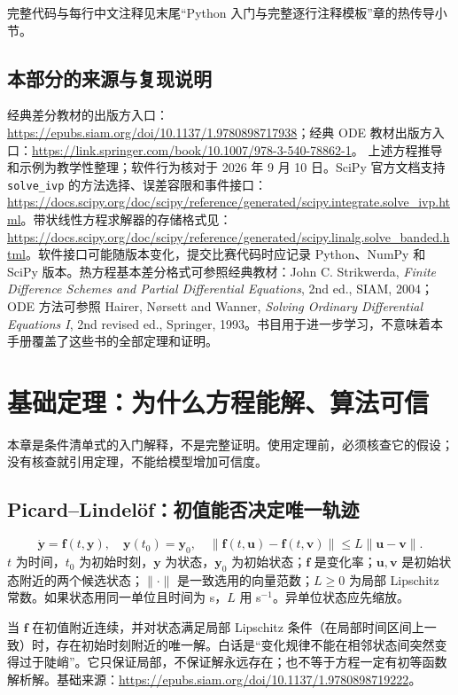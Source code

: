 \documentclass[UTF8,zihao=-4,openany,oneside,fontset=windows]{ctexbook}
\begin{document}
完整代码与每行中文注释见末尾“Python 入门与完整逐行注释模板”章的热传导小节。

\section{本部分的来源与复现说明}
经典差分教材的出版方入口：\url{https://epubs.siam.org/doi/10.1137/1.9780898717938}；经典 ODE 教材出版方入口：\url{https://link.springer.com/book/10.1007/978-3-540-78862-1}。
上述方程推导和示例为教学性整理；软件行为核对于 2026 年 9 月 10 日。SciPy 官方文档支持 \texttt{solve\_ivp} 的方法选择、误差容限和事件接口：\url{https://docs.scipy.org/doc/scipy/reference/generated/scipy.integrate.solve_ivp.html}。带状线性方程求解器的存储格式见：\url{https://docs.scipy.org/doc/scipy/reference/generated/scipy.linalg.solve_banded.html}。软件接口可能随版本变化，提交比赛代码时应记录 Python、NumPy 和 SciPy 版本。热方程基本差分格式可参照经典教材：John C. Strikwerda, \textit{Finite Difference Schemes and Partial Differential Equations}, 2nd ed., SIAM, 2004；ODE 方法可参照 Hairer, N\o rsett and Wanner, \textit{Solving Ordinary Differential Equations I}, 2nd revised ed., Springer, 1993。书目用于进一步学习，不意味着本手册覆盖了这些书的全部定理和证明。

\chapter{基础定理：为什么方程能解、算法可信}
本章是条件清单式的入门解释，不是完整证明。使用定理前，必须核查它的假设；没有核查就引用定理，不能给模型增加可信度。
\section{Picard--Lindelöf：初值能否决定唯一轨迹}
\begin{equation}\dot{\boldsymbol y}=\boldsymbol f(t,\boldsymbol y),\quad\boldsymbol y(t_0)=\boldsymbol y_0,\quad \|\boldsymbol f(t,\boldsymbol u)-\boldsymbol f(t,\boldsymbol v)\|\le L\|\boldsymbol u-\boldsymbol v\|.\end{equation}
$t$ 为时间，$t_0$ 为初始时刻，$\boldsymbol y$ 为状态，$\boldsymbol y_0$ 为初始状态；$\boldsymbol f$ 是变化率；$\boldsymbol u,\boldsymbol v$ 是初始状态附近的两个候选状态；$\|\cdot\|$ 是一致选用的向量范数；$L\ge0$ 为局部 Lipschitz 常数。如果状态用同一单位且时间为 s，$L$ 用 s$^{-1}$。异单位状态应先缩放。

当 $\boldsymbol f$ 在初值附近连续，并对状态满足局部 Lipschitz 条件（在局部时间区间上一致）时，存在初始时刻附近的唯一解。白话是“变化规律不能在相邻状态间突然变得过于陡峭”。它只保证局部，不保证解永远存在；也不等于方程一定有初等函数解析解。基础来源：\url{https://epubs.siam.org/doi/10.1137/1.9780898719222}。
\end{document}
